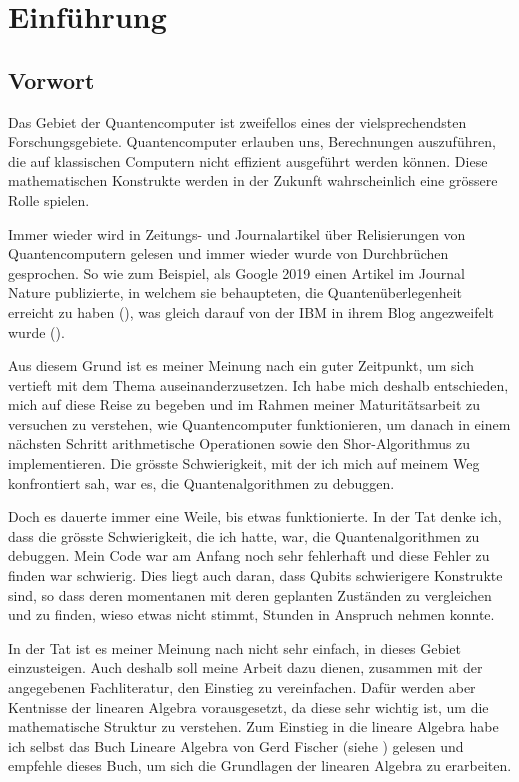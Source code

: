 \chapter{Einführung}
\section{Vorwort}
Das Gebiet der Quantencomputer ist zweifellos eines der vielsprechendsten Forschungsgebiete. Quantencomputer erlauben uns, Berechnungen auszuführen, die auf klassischen Computern nicht effizient ausgeführt werden können. Diese mathematischen Konstrukte werden in der Zukunft wahrscheinlich eine grössere Rolle spielen. 

Immer wieder wird in Zeitungs- und Journalartikel über Relisierungen von Quantencomputern gelesen und immer wieder wurde von Durchbrüchen gesprochen. So wie zum Beispiel, als Google 2019 einen Artikel im Journal \grqq Nature\grqq{} publizierte, in welchem sie behaupteten, die \grqq Quantenüberlegenheit\grqq{} erreicht zu haben (\cite{GSP}), was gleich darauf von der IBM in ihrem Blog angezweifelt wurde (\cite{IBM}).

Aus diesem Grund ist es meiner Meinung nach ein guter Zeitpunkt, um sich vertieft mit dem Thema auseinanderzusetzen. Ich habe mich deshalb entschieden, mich auf diese Reise zu begeben und im Rahmen meiner Maturitätsarbeit zu versuchen zu verstehen, wie Quantencomputer funktionieren, um danach in einem nächsten Schritt arithmetische Operationen sowie den Shor-Algorithmus zu implementieren. Die grösste Schwierigkeit, mit der ich mich auf meinem Weg konfrontiert sah, war es, die Quantenalgorithmen zu debuggen.

Doch es dauerte immer eine Weile, bis etwas funktionierte. In der Tat denke ich, dass die grösste Schwierigkeit, die ich hatte, war, die Quantenalgorithmen zu debuggen. Mein Code war am Anfang noch sehr fehlerhaft und diese Fehler zu finden war schwierig. Dies liegt auch daran, dass Qubits schwierigere Konstrukte sind, so dass deren momentanen mit deren geplanten Zuständen zu vergleichen und zu finden, wieso etwas nicht stimmt, Stunden in Anspruch nehmen konnte.

In der Tat ist es meiner Meinung nach nicht sehr einfach, in dieses Gebiet einzusteigen. Auch deshalb soll meine Arbeit dazu dienen, zusammen mit der angegebenen Fachliteratur, den Einstieg zu vereinfachen. Dafür werden aber Kentnisse der linearen Algebra vorausgesetzt, da diese sehr wichtig ist, um die mathematische Struktur zu verstehen. Zum Einstieg in die lineare Algebra habe ich selbst das Buch \grqq Lineare Algebra\grqq{} von Gerd Fischer (siehe \cite{LA}) gelesen und empfehle dieses Buch, um sich die Grundlagen der linearen Algebra zu erarbeiten.

